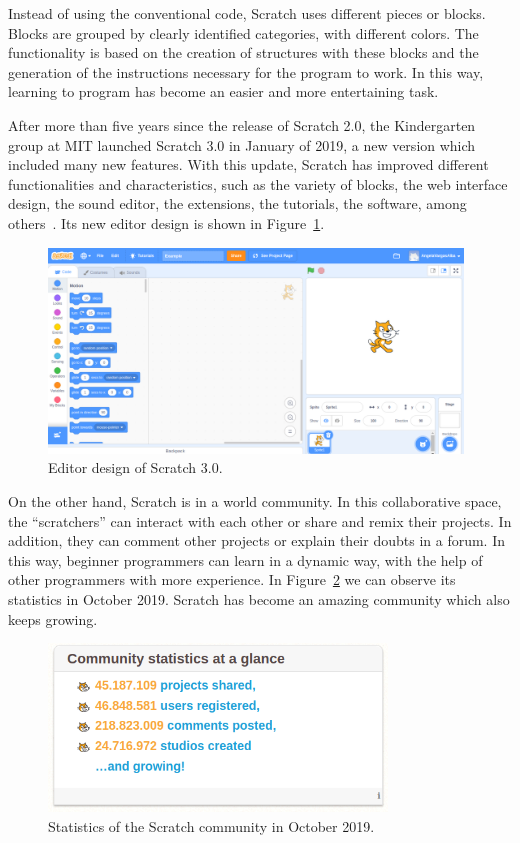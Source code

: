 Instead of using the conventional code, Scratch uses different pieces or blocks. Blocks are grouped by clearly identified categories, with different colors. The functionality is based on the creation of structures with these blocks and the generation of the instructions necessary for the program to work. In this way, learning to program has become an easier and more entertaining task.

After more than five years since the release of Scratch 2.0, the Kindergarten group at MIT launched Scratch 3.0 in January of 2019, a new version which included many new features. With this update, Scratch has improved different functionalities and characteristics, such as the variety of blocks, the web interface design, the sound editor, the extensions, the tutorials, the software, among others~\cite{nin:_scratch3.0}. Its new editor design is shown in Figure~\ref{fig:scratch}.


\begin{figure}
  \centering
  \includegraphics[width=11cm, keepaspectratio]{img/scratch.png}
  \caption{Editor design of Scratch 3.0.}
  \label{fig:scratch}
\end{figure}

On the other hand, Scratch is in a world community. In this collaborative space, the ``scratchers'' can interact with each other or share and remix their projects. In addition, they can comment other projects or explain their doubts in a forum. In this way, beginner programmers can learn in a dynamic way, with the help of other programmers with more experience. In Figure~\ref{fig:statistics_scratch} we can observe its statistics in October 2019. Scratch has become an amazing community which also keeps growing. 

\begin{figure}
  \centering
  \includegraphics[width=9cm, keepaspectratio]{img/statistics_scratch.png}
  \caption{Statistics of the Scratch community in October 2019.}
  \label{fig:statistics_scratch}
\end{figure}



